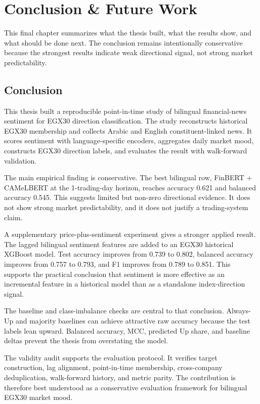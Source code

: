 \chapter{Conclusion \& Future Work}
\label{chap:conclusion}

This final chapter summarizes what the thesis built, what the results show, and what should be done next. The conclusion remains intentionally conservative because the strongest results indicate weak directional signal, not strong market predictability.

\section{Conclusion}

This thesis built a reproducible point-in-time study of bilingual financial-news sentiment for EGX30 direction classification. The study reconstructs historical EGX30 membership and collects Arabic and English constituent-linked news. It scores sentiment with language-specific encoders, aggregates daily market mood, constructs EGX30 direction labels, and evaluates the result with walk-forward validation.

The main empirical finding is conservative. The best bilingual row, FinBERT + CAMeLBERT at the 1-trading-day horizon, reaches accuracy 0.621 and balanced accuracy 0.545. This suggests limited but non-zero directional evidence. It does not show strong market predictability, and it does not justify a trading-system claim.

A supplementary price-plus-sentiment experiment gives a stronger applied result. The lagged bilingual sentiment features are added to an EGX30 historical XGBoost model. Test accuracy improves from 0.739 to 0.802, balanced accuracy improves from 0.757 to 0.793, and F1 improves from 0.789 to 0.851. This supports the practical conclusion that sentiment is more effective as an incremental feature in a historical model than as a standalone index-direction signal.

The baseline and class-imbalance checks are central to that conclusion. Always-Up and majority baselines can achieve attractive raw accuracy because the test labels lean upward. Balanced accuracy, MCC, predicted Up share, and baseline deltas prevent the thesis from overstating the model.

The validity audit supports the evaluation protocol. It verifies target construction, lag alignment, point-in-time membership, cross-company deduplication, walk-forward history, and metric parity. The contribution is therefore best understood as a conservative evaluation framework for bilingual EGX30 market mood.

